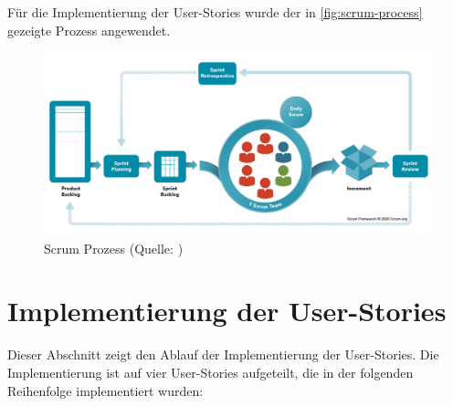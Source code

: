 \documentclass[a4paper, fontsize=11pt, parskip=half, twoside]{scrreprt}
\begin{document}
	Für die Implementierung der User-Stories wurde der in \autoref{fig:scrum-process} gezeigte Prozess angewendet.
		
	\begin{figure}[ht]
		\centering
		\includegraphics[scale=0.35]{assets/scrum-process.png}
		\caption{Scrum Prozess (Quelle: \textcite{noauthor_home_nodate})}
		\label{fig:scrum-process}
	\end{figure}
	
	
	\section{Implementierung der User-Stories}
	Dieser Abschnitt zeigt den Ablauf der Implementierung der User-Stories.
	Die Implementierung ist auf vier User-Stories aufgeteilt, die in der folgenden Reihenfolge implementiert wurden:
	
\end{document}
